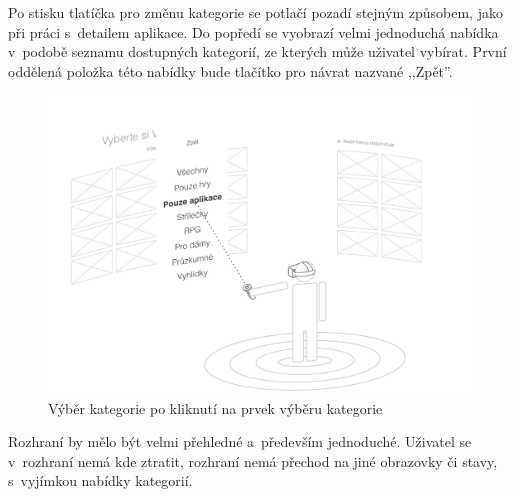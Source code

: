 Po stisku tlatíčka pro změnu kategorie se potlačí pozadí stejným
způsobem, jako při práci s~detailem aplikace. Do popředí se vyobrazí
velmi jednoduchá nabídka v~podobě seznamu dostupných kategorií, ze
kterých může uživatel vybírat. První oddělená položka této nabídky bude
tlačítko pro návrat nazvané ,,Zpět''.

\begin{figure}[h!]
\centering
\includegraphics[width=\textwidth]{src/assets/wireframe-sorting.pdf}
\caption{Výběr kategorie po kliknutí na prvek výběru kategorie}
\end{figure}

Rozhraní by mělo být velmi přehledné a~především jednoduché.
Uživatel se v~rozhraní nemá kde ztratit, rozhraní nemá přechod na jiné
obrazovky či stavy, s~vyjímkou nabídky kategorií.
